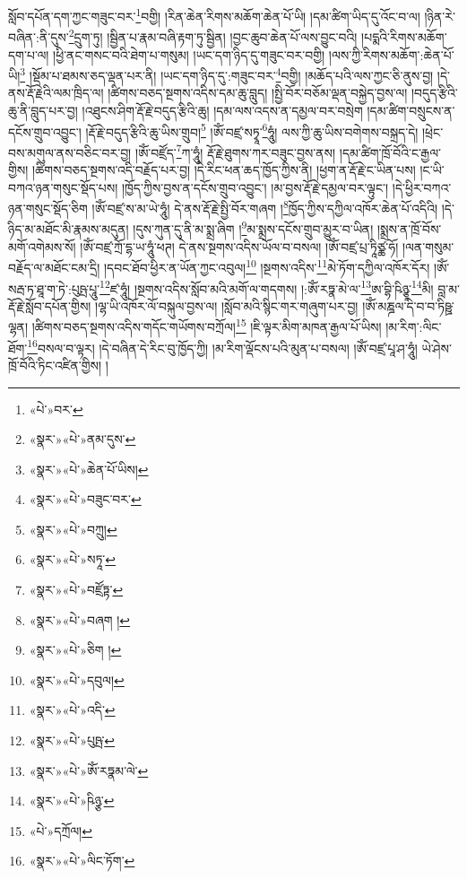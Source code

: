 སློབ་དཔོན་དག་ཀྱང་གཟུང་བར་\footnote{«པེ་»བར་}བགྱི། །རིན་ཆེན་རིགས་མཆོག་ཆེན་པོ་ཡི། །དམ་ཚིག་ཡིད་དུ་འོང་བ་ལ། །ཉིན་རེ་བཞིན་:ནི་དུས་\footnote{«སྣར་»«པེ་»ནམ་དུས་}དྲུག་ཏུ། །སྦྱིན་པ་རྣམ་བཞི་རྟག་ཏུ་སྦྱིན། །བྱང་ཆུབ་ཆེན་པོ་ལས་བྱུང་བའི། །པདྨའི་རིགས་མཆོག་དག་པ་ལ། །ཕྱི་ནང་གསང་བའི་ཐེག་པ་གསུམ། །ཡང་དག་ཉིད་དུ་གཟུང་བར་བགྱི། །ལས་ཀྱི་རིགས་མཆོག་:ཆེན་པོ་ཡི།\footnote{«སྣར་»«པེ་»ཆེན་པོ་ཡིས།} །སྡོམ་པ་ཐམས་ཅད་ལྡན་པར་ནི། །ཡང་དག་ཉིད་དུ་:གཟུང་བར་\footnote{«སྣར་»«པེ་»བཟུང་བར་}བགྱི། །མཆོད་པའི་ལས་ཀྱང་ཅི་ནུས་བྱ། །དེ་ནས་རྡོ་རྗེའི་ལམ་ཁྲིད་ལ། །ཚིགས་བཅད་སྔགས་འདིས་དམ་ཆུ་བླུད། །སྤྱི་བོར་བཅོམ་ལྡན་བསྐྱེད་བྱས་ལ། །བདུད་རྩིའི་ཆུ་ནི་བླུད་པར་བྱ། །འཐུངས་ཤིག་རྡོ་རྗེ་བདུད་རྩིའི་ཆུ། །དམ་ལས་འདས་ན་དམྱལ་བར་བསྲེག །དམ་ཚིག་བསྲུངས་ན་དངོས་གྲུབ་འབྱུང་། །རྡོ་རྗེ་བདུད་རྩིའི་ཆུ་ཡིས་གྲུབ།\footnote{«སྣར་»«པེ་»བཀྲུ།} །ཨོཾ་བཛྲ་སཏྭཱ་\footnote{«སྣར་»«པེ་»སཏཱ་}ཧཱུཾ། ལས་ཀྱི་ཆུ་ཡིས་བགེགས་བསྐྲད་དེ། །ཕྲེང་བས་མགུལ་ནས་བཅིང་བར་བྱ། །ཨོཾ་བཛྲོད་\footnote{«སྣར་»«པེ་»བཛྲོཏྟ་}ཀ་ཧཱུཾ། རྡོ་རྗེ་ཐུགས་ཀར་བཟུང་བྱས་ནས། །དམ་ཚིག་ཁྲོ་བོའི་ང་རྒྱལ་གྱིས། །ཚིགས་བཅད་སྔགས་འདི་བརྗོད་པར་བྱ། །དེ་རིང་ཕན་ཆད་ཁྱོད་ཀྱིས་ནི། །ཕྱག་ན་རྡོ་རྗེ་ང་ཡིན་པས། །ང་ཡི་བཀའ་ཉན་གསུང་སྡོད་པས། །ཁྱོད་ཀྱིས་བྱས་ན་དངོས་གྲུབ་འབྱུང་། །མ་བྱས་རྡོ་རྗེ་དམྱལ་བར་ལྟུང་། །དེ་ཕྱིར་བཀའ་ཉན་གསུང་སྡོད་ཅིག །ཨོཾ་བཛྲ་ས་མ་ཡེ་ཧཱུཾ། དེ་ནས་རྡོ་རྗེ་སྤྱི་བོར་གཞག །\footnote{«སྣར་»«པེ་»བཞག །}ཁྱོད་ཀྱིས་དཀྱིལ་འཁོར་ཆེན་པོ་འདིའི། །དེ་ཉིད་མ་མཐོང་མི་རྣམས་མདུན། །དུས་ཀུན་དུ་ནི་མ་སྨྲ་ཞིག །\footnote{«སྣར་»«པེ་»ཅིག །}མ་སྨྲས་དངོས་གྲུབ་མྱུར་བ་ཡིན། །སྨྲས་ན་ཁྲོ་བོས་མགོ་འགེམས་སོ། །ཨོཾ་བཛྲ་ཀྲོ་དྷ་ཡ་ཧཱུཾ་ཕཊ། དེ་ནས་སྔགས་འདིས་ཡོལ་བ་བསལ། །ཨོཾ་བཛྲ་པྲ་ཏཱིཙྪ་ཧོ། །ལན་གསུམ་བརྗོད་ལ་མཐོང་ངམ་དྲི། །དབང་ཐོབ་ཕྱིར་ན་ཡོན་ཀྱང་འབུལ།\footnote{«སྣར་»«པེ་»དབུལ།} །སྔགས་འདིས་\footnote{«སྣར་»«པེ་»འདི་}མེ་ཏོག་དཀྱིལ་འཁོར་དོར། །ཨོཾ་སརྦ་ཏ་ཐཱ་ག་ཏེ་:པུཥྤ་པཱུ་\footnote{«སྣར་»«པེ་»པུཥྤ་}ཛ་ཧཱུཾ། །སྔགས་འདིས་སློབ་མའི་མགོ་ལ་གདགས། །:ཨོཾ་རཏྣ་མེ་ལ་\footnote{«སྣར་»«པེ་»ཨོཾ་རཏྣམ་ལེ་}ཨ་བྷི་ཥིཉྩཱ་\footnote{«སྣར་»«པེ་»ཥིཉྩ་}མི། བླ་མ་རྡོ་རྗེ་སློབ་དཔོན་གྱིས། །ལྷ་ཡི་འཁོར་ལོ་བསྐུལ་བྱས་ལ། །སློབ་མའི་སྙིང་གར་གཞུག་པར་བྱ། །ཨོཾ་མཎྜལ་དེ་བ་བ་ཏིཥྛ་ལྷན། །ཚིགས་བཅད་སྔགས་འདིས་གདོང་གཡོགས་བཀྲོལ།\footnote{«པེ་»དཀྲོལ།} །ཇི་ལྟར་མིག་མཁན་རྒྱལ་པོ་ཡིས། །མ་རིག་:ལིང་ཐོག་\footnote{«སྣར་»«པེ་»ལིང་ཏོག་}བསལ་བ་ལྟར། །དེ་བཞིན་དེ་རིང་བུ་ཁྱོད་ཀྱི། །མ་རིག་ལྡོངས་པའི་མུན་པ་བསལ། །ཨོཾ་བཛྲ་པཱ་ཤ་ཧཱུཾ། ཡེ་ཤེས་ཁྲོ་བོའི་ཏིང་འཛིན་གྱིས། །
